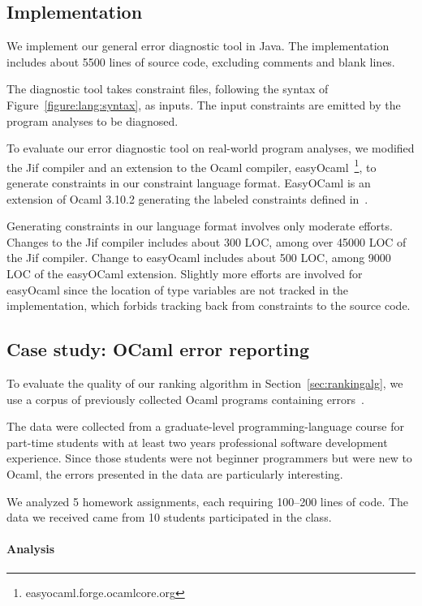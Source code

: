 \subsection{Implementation}

We implement our general error diagnostic tool in Java. The
implementation includes about 5500 lines of source code, excluding
comments and blank lines.

The diagnostic tool takes constraint files, following the syntax of
Figure~\ref{figure:lang:syntax}, as inputs. The input constraints are
emitted by the program analyses to be diagnosed.

To evaluate our error diagnostic tool on real-world program analyses,
we modified the Jif compiler and an extension to the Ocaml compiler,
easyOcaml~\footnote{easyocaml.forge.ocamlcore.org}, to generate
constraints in our constraint language format. EasyOCaml is an
extension of Ocaml 3.10.2 generating the labeled constraints defined
in~\cite{haack:slicing}.

Generating constraints in our language format involves only moderate
efforts. Changes to the Jif compiler includes about 300 LOC, among
over 45000 LOC of the Jif compiler. Change to easyOcaml includes about
500 LOC, among 9000 LOC of the easyOCaml extension.  Slightly more
efforts are involved for easyOcaml since the location of type
variables are not tracked in the implementation, which forbids
tracking back from constraints to the source code.

\subsection{Case study: OCaml error reporting}

To evaluate the quality of our ranking algorithm in
Section~\ref{sec:rankingalg}, we use a corpus of previously collected
Ocaml programs containing errors~\cite{lerner:pldi07}.

The data were collected from a graduate-level programming-language
course for part-time students with at least two years professional
software development experience. Since those students were not
beginner programmers but were new to Ocaml, the errors presented in
the data are particularly interesting.

We analyzed 5 homework assignments, each requiring 100--200 lines of
code. The data we received came from 10 students participated in the
class.

\paragraph{Analysis}

